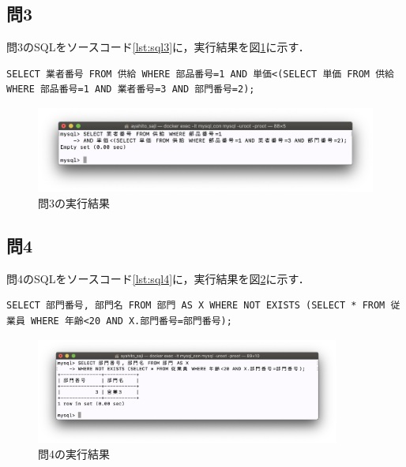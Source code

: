 \documentclass[uplatex]{jsarticle}
\begin{document}
\subsection{問3}
問3のSQLをソースコード\ref{lst:sql3}に，実行結果を図\ref{fig:ans3}に示す．
\begin{lstlisting}[caption=問3のSQL,label=lst:sql3]
SELECT 業者番号 FROM 供給 WHERE 部品番号=1 AND 単価<(SELECT 単価 FROM 供給 WHERE 部品番号=1 AND 業者番号=3 AND 部門番号=2);
\end{lstlisting}
\begin{figure}[htb]
\begin{center}
\includegraphics[width=120mm]{figures/ans3.png}
\caption{問3の実行結果}
\label{fig:ans3}
\end{center}
\end{figure}

\subsection{問4}
問4のSQLをソースコード\ref{lst:sql4}に，実行結果を図\ref{fig:ans4}に示す．
\begin{lstlisting}[caption=問4のSQL,label=lst:sql4]
SELECT 部門番号, 部門名 FROM 部門 AS X WHERE NOT EXISTS (SELECT * FROM 従業員 WHERE 年齢<20 AND X.部門番号=部門番号);
\end{lstlisting}
\begin{figure}[htb]
\begin{center}
\includegraphics[width=100mm]{figures/ans4.png}
\caption{問4の実行結果}
\label{fig:ans4}
\end{center}
\end{figure}
\end{document}
